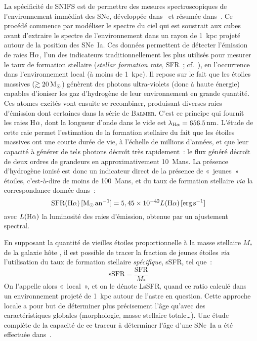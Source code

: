 \documentclass[../main/main.tex]{subfiles}
\begin{document}
La spécificité de SNIFS est de permettre des mesures spectroscopiques de
l'environnement immédiat des SNe, développée dans~\cite{rigault2013} et résumée
dans~\cite{rigault2020}. Ce procédé commence par modéliser le spectre du ciel
qui est soustrait aux cubes avant d'extraire le spectre de l'environnement dans
un rayon de \SI{1}{kpc} projeté autour de la position des SNe~Ia. Ces données
permettent de détecter l'émission de raies H$\a$, l'un des indicateurs
traditionnellement les plus utilisés pour mesurer le taux de formation stellaire
(\textit{stellar formation rate}, SFR~; cf.~\cite{kennicutt1998}), en
l'occurrence dans l'environnement local (à moins de \SI{1}{kpc}). Il repose sur
le fait que les étoiles massives ($\gtrsim \SI{20}{\Msun}$) génèrent des photons
ultra-violets (donc à haute énergie) capables d'ioniser les gaz d'hydrogène de
leur environnement \citep{calzetti2013} en grande quantité. Ces atomes excités
vont ensuite se recombiner, produisant diverses raies d'émission dont certaines
dans la série de \textsc{Balmer}. C'est ce principe qui fournit les raies H$\a$,
dont la longueur d'onde dans le vide est $\lambda_{\mathrm{H}\a} =
\SI{656.5}{nm}$. L'étude de cette raie permet l'estimation de la formation
stellaire du fait que les étoiles massives ont une courte durée de vie, à
l'échelle de millions d'années, et que leur capacité à générer de tels photons
décroît très rapidement~: le flux généré décroît de deux ordres de grandeurs
en approximativement \SI{10}{Mans}. La présence d'hydrogène ionisé est donc un
indicateur direct de la présence de «~jeunes~» étoiles, c'est-à-dire de moins de
\SI{100}{Mans}, et du taux de formation stellaire \textit{via} la
correspondance donnée dans~\cite{calzetti2013}:
\begin{equation}\label{eq:sfrha}
    \mathrm{SFR}(\mathrm{H}\alpha)\,[\si{\Msun.an^{-1}}] =
    5,45\times 10^{-42}L(\mathrm{H}\a)\,[\si{erg.s^{-1}}]
\end{equation}
avec $L(\mathrm{H}\a)$ la luminosité des raies d'émission, obtenue par un
ajustement spectral.

En supposant la quantité de vieilles étoiles proportionnelle à la masse
stellaire $M_*$ de la galaxie hôte \citep{mannucci2005, scannapieco2005}, il est
possible de tracer la fraction de jeunes étoiles \textit{via} l'utilisation du
taux de formation stellaire \textit{spécifique}, sSFR, tel que~:
\begin{equation}\label{eq:ssfr}
    \mathrm{sSFR} = \frac{\mathrm{SFR}}{M_*}
\end{equation}
On l'appelle alors «~local~», et on le dénote LsSFR, quand ce ratio calculé dans
un environnement projeté de \SI{1}{kpc} autour de l'astre en question. Cette
approche locale a pour but de déterminer plus précisement l'âge qu'avec des
caractéristiques globales (morphologie, masse stellaire totale…). Une étude
complète de la capacité de ce traceur à déterminer l'âge d'une SNe~Ia a été
effectuée dans~\cite{briday2021, briday2022}.
\end{document}
